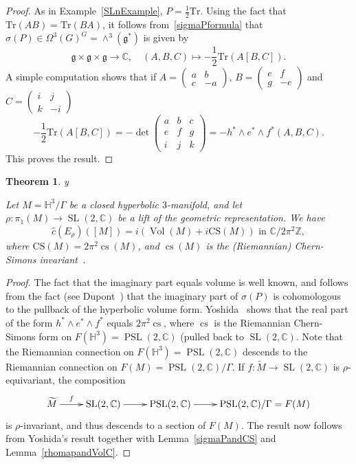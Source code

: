 \documentclass[11pt]{amsart}
\newtheorem{theorem}{Theorem}[section]
\theoremstyle{definition}
\numberwithin{equation}{section}
\def\printname#1{
        \if\draft y
                \smash{\makebox[0pt]{\hspace{-0.5in}
                        \raisebox{8pt}{\tt\tiny #1}}}
        \fi
}
\def\lbl#1{\label{#1}\printname{#1}}
\DeclareMathOperator{\Vol}{Vol}
\DeclareMathOperator{\CS}{CS}
\DeclareMathOperator{\cs}{cs}
\DeclareMathOperator{\Imag}{Im}
\DeclareMathOperator{\SL}{SL}
\DeclareMathOperator{\PSL}{PSL}
\DeclareMathOperator{\Tr}{Tr}
\newcommand{\C}{\mathbb C}
\renewcommand{\H}{\mathbb H}
\newcommand{\Mat}[4]{\left(\begin{smallmatrix}#1&#2\\#3&#4\end{smallmatrix}
\right)}
\newcommand{\Z}{\mathbb Z}
\def\e{\epsilon}
\def\CS{\mathrm{CS}}
\def\Tr{\mathrm{Tr}}
\begin{document}
\begin{proof}
As in Example~\ref{SLnExample}, $P=\frac{1}{2}\Tr$. Using the fact that 
$\Tr(AB)=\Tr(BA)$, it follows from~\eqref{sigmaPformula} that 
$\sigma(P)\in\Omega^3(G)^G=\wedge^3(\mathfrak g^*)$ is given by
\begin{equation}
\mathfrak g\times\mathfrak g\times\mathfrak g\to \C,\quad (A,B,C)\mapsto -\frac{1}{2}\Tr(A[B,C]).
\end{equation}
A simple computation shows that if $A=\Mat{a}{b}{c}{-a}$, $B=\Mat{e}{f}{g}{-e}$ and $C=\Mat{i}{j}{k}{-i}$
\begin{equation}
-\frac{1}{2}\Tr(A[B,C])=-\det\left(\begin{smallmatrix}a&b&c\\e&f&g\\i&j&k\end{smallmatrix}\right)=-h^*\wedge e^*\wedge f^*(A,B,C).
\end{equation}
This proves the result.
\end{proof}

\begin{theorem}
\lbl{SL2complexvolume} 
Let $M=\H^3/\Gamma$ be a closed hyperbolic $3$-manifold, and let $\rho\colon\pi_1(M)\to\SL(2,\C)$ be a lift of the geometric representation. We have
\begin{equation}
\widehat c(E_\rho)([M])=i(\Vol(M)+i\CS(M))\text{ in }\C/2\pi^2\Z,
\end{equation}
where $\CS(M)=2\pi^2\cs(M)$, and $\cs(M)$ is the (Riemannian) Chern-Simons invariant~\cite[(6.2)]{ChernSimons}.
\end{theorem}

\begin{proof} 
The fact that the imaginary part equals volume is well known, and follows from the fact (see Dupont~\cite{Dupont}) that the imaginary part of $\sigma(P)$ is cohomologous to the pullback of the hyperbolic volume form. Yoshida~\cite[Lemma~3.1]{Yoshida} shows that the real part of the form $h^*\wedge e^*\wedge f^*$ equals $2\pi^2\cs$, where $\cs$ is the Riemannian Chern-Simons form on $F(\H^3)=\PSL(2,\C)$ (pulled back to $\SL(2,\C)$. Note that the Riemannian connection on $F(\H^3)=\PSL(2,\C)$ descends to the Riemannian connection on $F(M)=\PSL(2,\C)/\Gamma$. If $f\colon\widetilde M\to\SL(2,\C)$ is $\rho$-equivariant, the composition
\begin{equation}
\xymatrix{{\widetilde M}\ar[r]^-f&{\SL(2,\C)}\ar[r]&{\PSL(2,\C)}\ar[r]&{\PSL(2,\C)/\Gamma=F(M)}}
\end{equation}
is $\rho$-invariant, and thus descends to a section of $F(M)$. The result now follows from Yoshida's result together with Lemma~\ref{sigmaPandCS} and Lemma~\ref{rhomapandVolC}. 
\end{proof}
\end{document}
